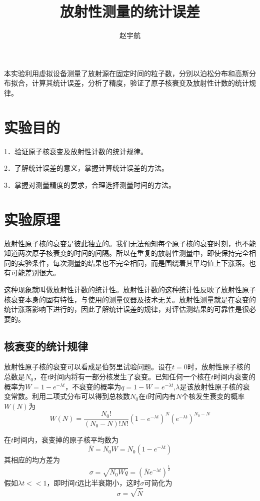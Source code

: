 \documentclass[hyperref]{ctexart}
\title{\textbf{放射性测量的统计误差}}
\author{\sffamily 赵宇航}
\date{}
\begin{document}
\maketitle
{}本实验利用虚拟设备测量了放射源在固定时间的粒子数，分别以泊松分布和高斯分布拟合，计算其统计误差，分析了精度，验证了原子核衰变及放射性计数的统计规律。\\	
\begin{multicols}{2}
\section{实验目的}
1．验证原子核衰变及放射性计数的统计规律。

2．了解统计误差的意义，掌握计算统计误差的方法。

3．掌握对测量精度的要求，合理选择测量时间的方法。
\section{实验原理}
放射性原子核的衰变是彼此独立的。我们无法预知每个原子核的衰变时刻，也不能知道两次原子核衰变的时间的间隔。所以在重复的放射性测量中，即使保持完全相同的实验条件，每次测量的结果也不完全相同，而是围绕着其平均值上下涨落。也有可能差别很大。

这种现象就叫做放射性计数的统计性。放射性计数的这种统计性反映了放射性原子核衰变本身的固有特性，与使用的测量仪器及技术无关。放射性测量就是在衰变的统计涨落影响下进行的，因此了解统计误差的规律，对评估测结果的可靠性是很必要的。
\subsection{核衰变的统计规律}
放射性原子核的衰变可以看成是伯努里试验问题。设在$t=0$时，放射性原子核的总数是$N_0$，在$t$时间内将有一部分核发生了衰变。已知任何一个核在$t$时间内衰变的概率为$W=1-e^{-\lambda t}$，不衰变的概率为$q=1-W=e^{-\lambda t}$,$\lambda$是该放射性原子核的衰变常数。利用二项式分布可以得到总核数$N_0$在$t$时间内有$N$个核发生衰变的概率 $W(N)$为
\begin{equation}W(N)=\frac{N_0!}{(N_0-N)!N!}(1-e^{-\lambda t})^N(e^{-\lambda t})^{N_0-N}\end{equation}

在$t$时间内，衰变掉的原子核平均数为\begin{equation}\overline{N}=N_0W=N_0(1-e^{-\lambda t})\end{equation}
其相应的均方差为\begin{equation}\sigma=\sqrt{N_0Wq}=(\overline{N}e^{-\lambda t})^{\frac{1}{2}}\end{equation}
假如$\lambda t<<1$，即时间$t$远比半衰期小，这时$\sigma$可简化为\begin{equation}\sigma=\sqrt{\overline{N}}\end{equation}


\end{multicols}
\end{document}

